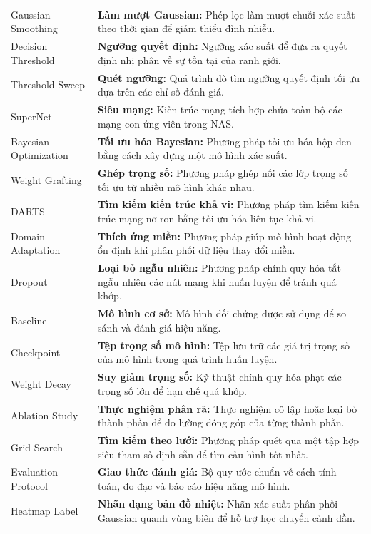 {\begin{longtable}{L{4.2cm}L{8.8cm}}
Gaussian Smoothing & \textbf{Làm mượt Gaussian:} Phép lọc làm mượt chuỗi xác suất theo thời gian để giảm thiểu đỉnh nhiễu. \\
Decision Threshold & \textbf{Ngưỡng quyết định:} Ngưỡng xác suất để đưa ra quyết định nhị phân về sự tồn tại của ranh giới. \\
Threshold Sweep & \textbf{Quét ngưỡng:} Quá trình dò tìm ngưỡng quyết định tối ưu dựa trên các chỉ số đánh giá. \\
SuperNet & \textbf{Siêu mạng:} Kiến trúc mạng tích hợp chứa toàn bộ các mạng con ứng viên trong NAS. \\
Bayesian Optimization & \textbf{Tối ưu hóa Bayesian:} Phương pháp tối ưu hóa hộp đen bằng cách xây dựng một mô hình xác suất. \\
Weight Grafting & \textbf{Ghép trọng số:} Phương pháp ghép nối các lớp trọng số tối ưu từ nhiều mô hình khác nhau. \\
DARTS & \textbf{Tìm kiếm kiến trúc khả vi:} Phương pháp tìm kiếm kiến trúc mạng nơ-ron bằng tối ưu hóa liên tục khả vi. \\
Domain Adaptation & \textbf{Thích ứng miền:} Phương pháp giúp mô hình hoạt động ổn định khi phân phối dữ liệu thay đổi miền. \\
Dropout & \textbf{Loại bỏ ngẫu nhiên:} Phương pháp chính quy hóa tắt ngẫu nhiên các nút mạng khi huấn luyện để tránh quá khớp. \\
Baseline & \textbf{Mô hình cơ sở:} Mô hình đối chứng được sử dụng để so sánh và đánh giá hiệu năng. \\
Checkpoint & \textbf{Tệp trọng số mô hình:} Tệp lưu trữ các giá trị trọng số của mô hình trong quá trình huấn luyện. \\
Weight Decay & \textbf{Suy giảm trọng số:} Kỹ thuật chính quy hóa phạt các trọng số lớn để hạn chế quá khớp. \\
Ablation Study & \textbf{Thực nghiệm phân rã:} Thực nghiệm cô lập hoặc loại bỏ thành phần để đo lường đóng góp của từng thành phần. \\
Grid Search & \textbf{Tìm kiếm theo lưới:} Phương pháp quét qua một tập hợp siêu tham số định sẵn để tìm cấu hình tốt nhất. \\
Evaluation Protocol & \textbf{Giao thức đánh giá:} Bộ quy ước chuẩn về cách tính toán, đo đạc và báo cáo hiệu năng mô hình. \\
Heatmap Label & \textbf{Nhãn dạng bản đồ nhiệt:} Nhãn xác suất phân phối Gaussian quanh vùng biên để hỗ trợ học chuyển cảnh dần. \\
\bottomrule
\end{longtable}
}
